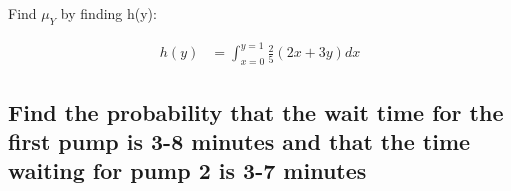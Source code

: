 \documentclass[]{article}
\begin{document}
		Find $\mu_Y$ by finding h(y):
		
		\begin{align*}
			h(y)  &= \int_{x=0}^{y=1}\frac{2}{5}(2x+3y)dx
		\end{align*}
		
		\subsection{Find the probability that the wait time for the first pump is 3-8 minutes and that the time waiting for pump 2 is 3-7 minutes}
\end{document}

